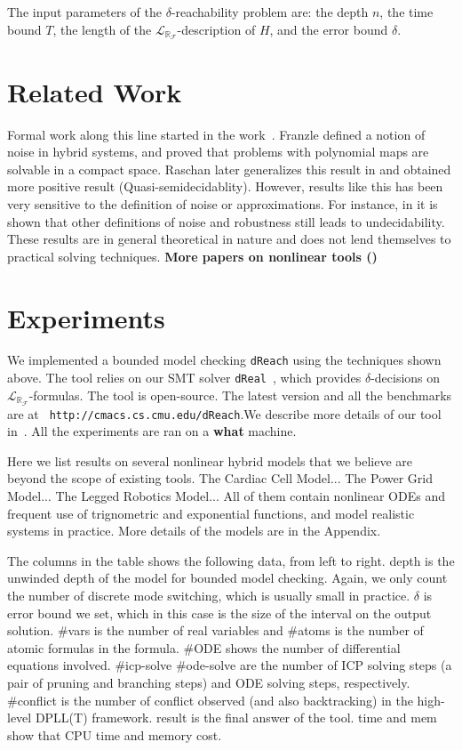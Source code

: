 \documentclass[envcountsect]{llncs}
\newcommand{\lrf}{\mathcal{L}_{\mathbb{R}_{\mathcal{F}}}}
\begin{document}
\begin{remark}
The input parameters of the $\delta$-reachability problem are: the depth $n$,
the time bound $T$, the length of the $\lrf$-description of $H$, and the error
bound $\delta$.
\end{remark}


\section{Related Work}\label{discuss}
Formal work along this line started in the work~\cite{}.
Franzle defined a notion of noise in hybrid systems, and proved that problems
with polynomial maps are solvable in a compact space. Raschan later generalizes
this result in \cite{} and obtained more positive result
(Quasi-semidecidablity). However, results like this has been very sensitive to
the definition of noise or approximations. For instance, in \cite{} it is shown
that other definitions of noise and robustness still leads to undecidability.
These results are in general theoretical in nature and does not lend themselves
to practical solving techniques. {\bf More papers on nonlinear tools ()}



\section{Experiments}\label{experiments}

We implemented a bounded model checking {\tt dReach} using the
techniques shown above. The tool relies on our SMT solver {\tt dReal}~\cite{},
which provides $\delta$-decisions on $\lrf$-formulas. The tool is
open-source. The latest version and all the benchmarks are at {\tt
http://cmacs.cs.cmu.edu/dReach}.We describe more details of our tool in~\cite{}.
All the experiments are ran on a {\bf what} machine. 

Here we list results on several nonlinear hybrid models that we believe are
beyond the scope of existing tools.
The {\sf Cardiac Cell Model}... The {\sf Power Grid Model}... The {\sf Legged
Robotics Model}... All of them contain nonlinear ODEs and frequent use of
trignometric and exponential functions, and model realistic systems in practice.
More details of the models are in the Appendix. 

The columns in the table shows the following data, from left to right. {\sf
depth} is the unwinded depth of the model for bounded model checking. Again, we
only count the number of discrete mode switching, which is usually small in
practice. {\sf $\delta$} is error bound we set, which in this case is the size
of the interval on the output solution. {\sf \#vars} is the number of real
variables and {\sf \#atoms} is the number of atomic
formulas in the formula. {\sf \#ODE} shows the number of differential equations
involved. \#{\sf icp-solve} \#{ode-solve} are the number of ICP solving steps (a
pair of pruning and branching steps) and ODE solving steps, respectively.
\#{\sf conflict} is the number of conflict observed (and also backtracking) in
the high-level DPLL(T) framework. {result} is the final answer of the tool. {\sf
time} and {\sf mem} show that CPU time and memory cost. 
\end{document}
